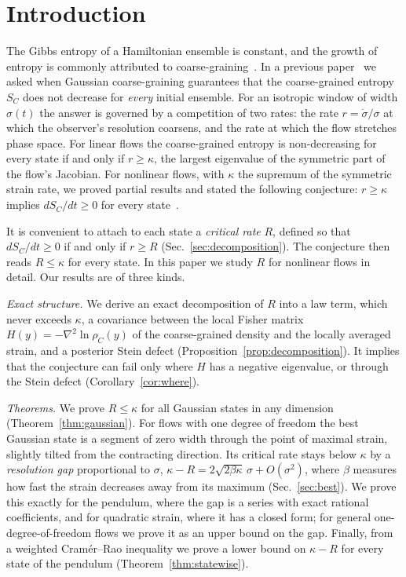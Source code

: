 \section{Introduction}
\label{sec:intro}

The Gibbs entropy of a Hamiltonian ensemble is constant, and the growth of entropy is commonly attributed to coarse-graining~\cite{gibbs1902,ehrenfest1912,wehrl1978,lebowitz1993}. In a previous paper~\cite{namba2026arrow} we asked when Gaussian coarse-graining guarantees that the coarse-grained entropy $S_C$ does not decrease for \emph{every} initial ensemble. For an isotropic window of width $\sigma(t)$ the answer is governed by a competition of two rates: the rate $r = \dot\sigma/\sigma$ at which the observer's resolution coarsens, and the rate at which the flow stretches phase space. For linear flows the coarse-grained entropy is non-decreasing for every state if and only if $r \geq \kappa$, the largest eigenvalue of the symmetric part of the flow's Jacobian. For nonlinear flows, with $\kappa$ the supremum of the symmetric strain rate, we proved partial results and stated the following conjecture: $r \geq \kappa$ implies $dS_C/dt \geq 0$ for every state~\cite{namba2026arrow}.

It is convenient to attach to each state a \emph{critical rate} $R$, defined so that $dS_C/dt \geq 0$ if and only if $r \geq R$ (Sec.~\ref{sec:decomposition}). The conjecture then reads $R \leq \kappa$ for every state. In this paper we study $R$ for nonlinear flows in detail. Our results are of three kinds.

\emph{Exact structure.} We derive an exact decomposition of $R$ into a law term, which never exceeds $\kappa$, a covariance between the local Fisher matrix $H(y) = -\nabla^2\ln\rho_C(y)$ of the coarse-grained density and the locally averaged strain, and a posterior Stein defect (Proposition~\ref{prop:decomposition}). It implies that the conjecture can fail only where $H$ has a negative eigenvalue, or through the Stein defect (Corollary~\ref{cor:where}).

\emph{Theorems.} We prove $R \leq \kappa$ for all Gaussian states in any dimension (Theorem~\ref{thm:gaussian}). For flows with one degree of freedom the best Gaussian state is a segment of zero width through the point of maximal strain, slightly tilted from the contracting direction. Its critical rate stays below $\kappa$ by a \emph{resolution gap} proportional to $\sigma$, $\kappa - R = 2\sqrt{2\beta\kappa}\,\sigma + O(\sigma^2)$, where $\beta$ measures how fast the strain decreases away from its maximum (Sec.~\ref{sec:best}). We prove this exactly for the pendulum, where the gap is a series with exact rational coefficients, and for quadratic strain, where it has a closed form; for general one-degree-of-freedom flows we prove it as an upper bound on the gap. Finally, from a weighted Cram\'er--Rao inequality we prove a lower bound on $\kappa - R$ for every state of the pendulum (Theorem~\ref{thm:statewise}).

